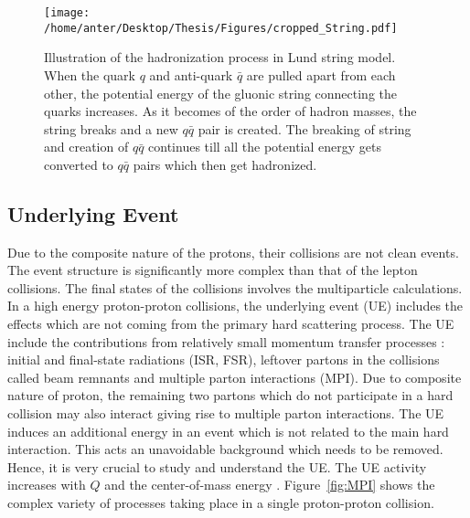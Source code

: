 \begin{figure}[!h]
\begin{center}
\hspace*{-4mm}
\texttt{[image: /home/anter/Desktop/Thesis/Figures/cropped\_String.pdf]}\\
\vspace*{4mm}
\caption[Illustration of the hadronization process in Lund string model.]{Illustration of the hadronization process in Lund string model\footnotemark. When the quark $q$ and anti-quark $\bar{q}$ are pulled apart from each other, the potential energy of the gluonic string connecting the quarks increases. As it becomes of the order of hadron masses, the string breaks and a new $q\bar{q}$ pair is created. The breaking of string and creation of $q\bar{q}$ continues till all the potential energy gets converted to $q\bar{q}$ pairs which then get hadronized.}
\label{fig:string}
\end{center}
\end{figure}
\subsection{Underlying Event}
Due to the composite nature of the protons, their collisions are not clean events. The event structure is significantly more complex than that of the lepton collisions. The final states of the collisions involves the multiparticle calculations. In a high energy proton-proton collisions, the underlying event (UE) includes the effects which are not coming from the primary hard scattering process. The UE include the contributions from relatively small momentum transfer processes : initial and final-state radiations (ISR, FSR), leftover partons in the collisions called beam remnants and multiple parton interactions (MPI). Due to composite nature of proton, the remaining two partons which do not participate in a hard collision may also interact giving rise to multiple parton interactions. The UE induces an additional energy in an event which is not related to the main hard interaction. This acts an unavoidable background which needs to be removed. Hence, it is very crucial to study and understand the UE. The UE activity increases with $Q$ and the center-of-mass energy \cme. Figure~\ref{fig:MPI} shows the complex variety of processes taking place in a single proton-proton collision.

